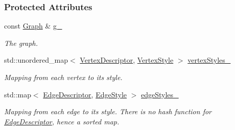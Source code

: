 \subsubsection*{Protected Attributes}
\begin{DoxyCompactItemize}
\item 
const \hyperlink{structslb_1_1core_1_1ui_1_1CurrentStyles_ac27c6fba620b638233a5c620f68c89bc}{Graph} \& \hyperlink{structslb_1_1core_1_1ui_1_1CurrentStyles_a4f67551367b7b4dc17f93df96d51c864}{g\+\_\+}\hypertarget{structslb_1_1core_1_1ui_1_1CurrentStyles_a4f67551367b7b4dc17f93df96d51c864}{}\label{structslb_1_1core_1_1ui_1_1CurrentStyles_a4f67551367b7b4dc17f93df96d51c864}

\begin{DoxyCompactList}\small\item\em The graph. \end{DoxyCompactList}\item 
std\+::unordered\+\_\+map$<$ \hyperlink{structslb_1_1core_1_1ui_1_1CurrentStyles_a5da5348d833acc6d19d20556f00765b9}{Vertex\+Descriptor}, \hyperlink{structslb_1_1core_1_1ui_1_1VertexStyle}{Vertex\+Style} $>$ \hyperlink{structslb_1_1core_1_1ui_1_1CurrentStyles_ab6f530b659136f839b7f51dbe15a8b8c}{vertex\+Styles\+\_\+}\hypertarget{structslb_1_1core_1_1ui_1_1CurrentStyles_ab6f530b659136f839b7f51dbe15a8b8c}{}\label{structslb_1_1core_1_1ui_1_1CurrentStyles_ab6f530b659136f839b7f51dbe15a8b8c}

\begin{DoxyCompactList}\small\item\em Mapping from each vertex to its style. \end{DoxyCompactList}\item 
std\+::map$<$ \hyperlink{structslb_1_1core_1_1ui_1_1CurrentStyles_aa63947c6380258a6f5147c75d3168e2a}{Edge\+Descriptor}, \hyperlink{structslb_1_1core_1_1ui_1_1EdgeStyle}{Edge\+Style} $>$ \hyperlink{structslb_1_1core_1_1ui_1_1CurrentStyles_ac4c13a371872935d47ecebeded6620c9}{edge\+Styles\+\_\+}\hypertarget{structslb_1_1core_1_1ui_1_1CurrentStyles_ac4c13a371872935d47ecebeded6620c9}{}\label{structslb_1_1core_1_1ui_1_1CurrentStyles_ac4c13a371872935d47ecebeded6620c9}

\begin{DoxyCompactList}\small\item\em Mapping from each edge to its style. There is no hash function for \hyperlink{structslb_1_1core_1_1ui_1_1CurrentStyles_aa63947c6380258a6f5147c75d3168e2a}{Edge\+Descriptor}, hence a sorted map. \end{DoxyCompactList}\end{DoxyCompactItemize}


